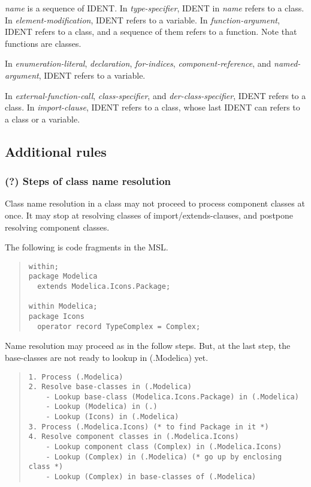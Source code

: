 \documentclass[10pt,b5paper]{article}
\begin{document}
{\it{}name\/} is a sequence of {IDENT}.  In {\it{}type-specifier},
IDENT in {\it{}name\/} refers to a class.  In
{\it{}element-modification}, IDENT refers to a variable.  In
{\it{}function-argument}, IDENT refers to a class, and a sequence of
them refers to a function.  Note that functions are classes.

In {\it{}enumeration-literal}, {\it{}declaration}, {\it{}for-indices},
{\it{}component-reference}, and {\it{}named-argument}, IDENT refers to
a variable.

In {\it{}external-function-call}, {\it{}class-specifier}, and
{\it{}der-class-specifier}, IDENT refers to a class.  In
{\it{}import-clause}, IDENT refers to a class, whose last IDENT can
refers to a class or a variable.


\subsection{Additional rules}

\subsubsection*{(?) Steps of class name resolution}

Class name resolution in a class may not proceed to process component
classes at once.  It may stop at resolving classes of
import/extends-clauses, and postpone resolving component classes.

The following is code fragments in the MSL.

\begin{quote}
\begin{lstlisting}[aboveskip=-\baselineskip]
within;
package Modelica
  extends Modelica.Icons.Package;

within Modelica;
package Icons
  operator record TypeComplex = Complex;
\end{lstlisting}
\end{quote}

Name resolution may proceed as in the follow steps.  But, at the last
step, the base-classes are not ready to lookup in (.Modelica) yet.
\begin{quote}
\begin{verbatim}
1. Process (.Modelica)
2. Resolve base-classes in (.Modelica)
    - Lookup base-class (Modelica.Icons.Package) in (.Modelica)
    - Lookup (Modelica) in (.)
    - Lookup (Icons) in (.Modelica)
3. Process (.Modelica.Icons) (* to find Package in it *)
4. Resolve component classes in (.Modelica.Icons)
    - Lookup component class (Complex) in (.Modelica.Icons)
    - Lookup (Complex) in (.Modelica) (* go up by enclosing class *)
    - Lookup (Complex) in base-classes of (.Modelica)
\end{verbatim}
\end{quote}
\end{document}
